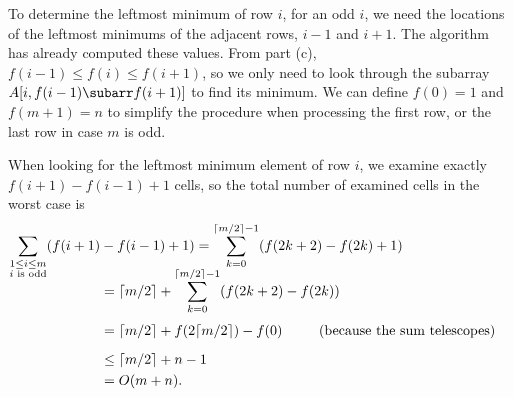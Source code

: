 To determine the leftmost minimum of row $i$, for an odd $i$, we need the locations of the leftmost minimums of the adjacent rows, $i-1$ and $i+1$.
The algorithm has already computed these values.
From part (c), $f(i-1)\le f(i)\le f(i+1)$, so we only need to look through the subarray $A[i,f(i-1)\subarr f(i+1)]$ to find its minimum.
We can define $f(0)=1$ and $f(m+1)=n$ to simplify the procedure when processing the first row, or the last row in case $m$ is odd.

When looking for the leftmost minimum element of row $i$, we examine exactly $f(i+1)-f(i-1)+1$ cells, so the total number of examined cells in the worst case is
\begin{align*}
    \sum_{\substack{1\le i\le m\\\text{$i$ is odd}}}(f(i+1)&-f(i-1)+1) = \sum_{k=0}^{\lceil m/2\rceil-1}(f(2k+2)-f(2k)+1) \\[-4mm]
    &= \lceil m/2\rceil+\sum_{k=0}^{\lceil m/2\rceil-1}(f(2k+2)-f(2k)) \\[1mm]
    &= \lceil m/2\rceil+f(2\lceil m/2\rceil)-f(0) && \hspace{-7em}\text{(because the sum telescopes)} \\[2mm]
    &\le \lceil m/2\rceil+n-1 \\
    &= O(m+n).
\end{align*}
